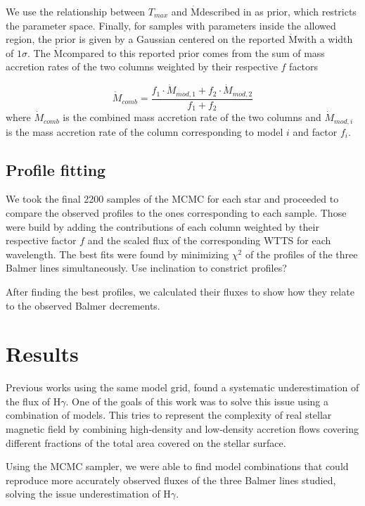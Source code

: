 \documentclass[twocolumn,linenumbers]{aastex631}
\newcommand{\hgamma}{H$\gamma$}
\newcommand{\mdot}{$\dot{\text{M}}$}
\newcommand{\Mdot}{{\dot{{M}}}}
\begin{document}
We use the relationship between $T_{max}$ and \mdot described in \citet{muzerolle2001} as prior, which restricts the parameter space. Finally, for samples with parameters inside the allowed region, the prior is given by a Gaussian centered on the reported \mdot with a width of $1\sigma$. The \mdot compared to this reported prior comes from the sum of mass accretion rates of the two columns weighted by their respective $f$ factors

\begin{equation}
    \Mdot_{comb} = \frac{f_1 \cdot \Mdot_{mod,1} + f_2 \cdot \Mdot_{mod,2}}{f_1 + f_2}
\end{equation}
where $\Mdot_{comb}$ is the combined mass accretion rate of the two columns and $\Mdot_{mod,i}$ is the mass accretion rate of the column corresponding to model $i$ and factor $f_i$. 


\subsection{Profile fitting}

We took the final 2200 samples of the MCMC for each star and proceeded to compare the observed profiles to the ones corresponding to each sample. Those were build by adding the contributions of each column weighted by their respective factor $f$ and the scaled flux of the corresponding WTTS for each wavelength. The best fits were found by minimizing $\chi^2$ of the profiles of the three Balmer lines simultaneously. Use inclination to constrict profiles?

After finding the best profiles, we calculated their fluxes to show how they relate to the observed Balmer decrements.

\section{Results}

Previous works using the same model grid, found a systematic underestimation of the flux of \hgamma. One of the goals of this work was to solve this issue using a combination of models. This tries to represent the complexity of real stellar magnetic field by combining high-density and low-density accretion flows covering different fractions of the total area covered on the stellar surface.

Using the MCMC sampler, we were able to find model combinations that could reproduce more accurately observed fluxes of the three Balmer lines studied, solving the issue underestimation of \hgamma.
\end{document}
